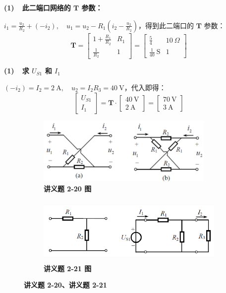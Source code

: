 \documentclass[UTF8]{report}
\theoremstyle{MyLineTheoremStyle} %
\theoremstyle{MyBlockTheoremStyle} %
\theoremstyle{MySubsubsectionStyle} %
\begin{document}
\noindent \textbf{(1)\ \ 此二端口网络的 $\boldsymbol{T}$ 参数：}

$i_1 = \frac{u_2}{R_2} + (-i_2),\quad u_1 = u_2 - R_1(i_2 - \frac{u_2}{R_2})$，得到此二端口的 $\boldsymbol{T}$ 参数：
\begin{equation}
\boldsymbol{T} = 
\begin{bmatrix}
    1 + \frac{R_1}{R_2} & R_1 \\ 
    \frac{1}{R_2} & 1
\end{bmatrix}
=
\begin{bmatrix}
    \frac{5}{4} & 10\  \Omega \\ 
    \frac{1}{40} \ \mathrm{S} & 1
\end{bmatrix}
\end{equation}

\noindent \textbf{(1)\ \ 求 $U_{S1}$ 和 $I_1$}

$(-i_2) = I_2 = 2\ \mathrm{A},\quad u_2 = I_2R_3 = 40\ \mathrm{V}$，代入即得：
\begin{equation}
\begin{bmatrix}
    U_{S1} \\ 
    I_1
\end{bmatrix}
= 
\boldsymbol{T}\cdot 
\begin{bmatrix}
    40\ \mathrm{V} \\ 
    2 \ \mathrm{A}
\end{bmatrix}
= 
\begin{bmatrix}
    70\ \mathrm{V} \\ 
    3 \ \mathrm{A}
\end{bmatrix}
\end{equation}

\begin{figure}[H]\centering
\begin{subfigure}[t]{0.5\columnwidth}\centering
    \includegraphics[height=92pt]{assets/4/ffe92b96174b737b0ba9725eef3dd53e.png}
    \caption{\bfseries 讲义题 2-20 图 }
\end{subfigure}\begin{subfigure}[t]{0.5\columnwidth}\centering
    \includegraphics[height=92pt]{assets/4/a3822dcee8e6253ad95a943b6b83e06e.png}
    \caption{\bfseries 讲义题 2-21 图 }
\end{subfigure}
\caption{\bfseries 讲义题 2-20、讲义题 2-21 }\label{求G参数}
\end{figure}
\end{document}
